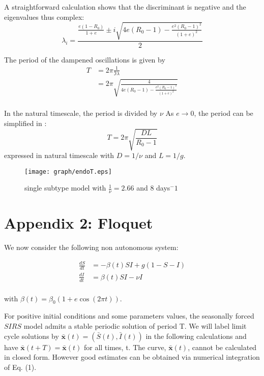 A straightforward calculation shows that the discriminant is negative and the eigenvalues thus complex:
$$\lambda_i = \frac{\frac{e(1-R_0)}{1+e} \pm i \sqrt{4 e (R_0-1)-\frac{e^2(R_0-1)^2}{(1+e)^2}}}{2} $$

The period of the dampened oscillations is given by 
\begin{align*}
  T & =2\pi \frac{1}{\Im{\lambda}} \\
& = 2\pi \sqrt{\frac{4}{4 e (R_0-1)-\frac{e^2(R_0-1)^2}{(1+e)^2}}} \\
\end{align*}

In the natural timescale, the period is divided by $\nu$
As $e \to 0$, the period can be simplified in :
$$T=2 \pi \sqrt{\frac{DL}{R_0-1}}$$ expressed in natural timescale with $D=1/\nu$ and $L=1/g$.


\begin{figure}[htb]
  \center
    \texttt{[image: graph/endoT.eps]}
    \caption{single subtype model with $\frac{1}{\nu}=2.66$ and 8 days$^-1$}
  \label{fig:intrinsicT}
\end{figure}

\clearpage
\newpage

\section{Appendix 2: Floquet}
\label{sec:appendix2}

We now consider the following non autonomous system:

\begin{align*}
  \frac{dS}{dt} & = -\beta(t) S I + g (1-S-I)\\
  \frac{dI}{dt} & = \beta(t) S I - \nu I\\
\end{align*}

with $\beta(t)=\beta_0(1+e \cos(2 \pi t))$.

For positive initial conditions and some parameters values, the seasonally forced $SIRS$ model admits a stable periodic solution of period T.
We will label limit cycle solutions by $\mathbf{\bar{x}}(t) = (\bar{S}(t), \bar{I}(t))$ in the following calculations and have $\mathbf{\bar{x}}(t + T ) = \mathbf{\bar{x}}(t)$ for all times, t. 
The curve, $\mathbf{\bar{x}}(t)$, cannot be calculated in closed form. However good estimates can be obtained via numerical integration of Eq. (1).

